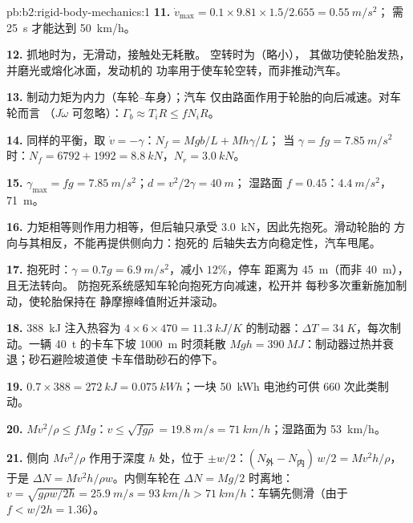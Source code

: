 \begin{solution}{pb:b2:rigid-body-mechanics:1}
\textbf{11.} $\dot v_{\max} = 0.1 \times 9.81 \times 1.5/2.655 = \qty{0.55}{m/s^2}$；
需 \qty{25}{s} 才能达到 \qty{50}{km/h}。

\textbf{12.} 抓地时为，无滑动，接触处无耗散。
空转时为（略小），
其做功使轮胎发热，并磨光或熔化冰面，发动机的
功率用于使车轮空转，而非推动汽车。

\textbf{13.} 制动力矩为内力（车轮–车身）；汽车
仅由路面作用于轮胎的向后减速。对车轮而言
（$J\dot\omega$ 可忽略）：$\Gamma_b \approx T_iR \le fN_iR$。

\textbf{14.} 同样的平衡，取 $\dot v = -\gamma$：$N_f = Mgb/L + Mh\gamma/L$；
当 $\gamma = fg = \qty{7.85}{m/s^2}$ 时：$N_f = 6792 + 1992 = \qty{8.8}{kN}$，$N_r =
\qty{3.0}{kN}$。

\textbf{15.} $\gamma_{\max} = fg = \qty{7.85}{m/s^2}$；$d = v^2/2\gamma = \qty{40}{m}$；
湿路面 $f = 0.45$：$\qty{4.4}{m/s^2}$，\qty{71}{m}。

\textbf{16.} 力矩相等则作用力相等，但后轴只承受
\qty{3.0}{kN}，因此先抱死。滑动轮胎的
方向与其相反，不能再提供侧向力：抱死的
后轴失去方向稳定性，汽车甩尾。

\textbf{17.} 抱死时：$\gamma = 0.7g = \qty{6.9}{m/s^2}$，减小 $12\%$，停车
距离为 \qty{45}{m}（而非 \qty{40}{m}），且无法转向。
防抱死系统感知车轮向抱死方向减速，松开并
每秒多次重新施加制动，使轮胎保持在
静摩擦峰值附近并滚动。

\textbf{18.} \qty{388}{kJ} 注入热容为 $4 \times 6 \times 470 = \qty{11.3}{kJ/K}$ 的制动器：$\Delta T =
\qty{34}{K}$，每次制动。一辆 \qty{40}{t} 的卡车下坡 \qty{1000}{m} 时须耗散
$Mgh = \qty{390}{MJ}$：制动器过热并衰退；砂石避险坡道使
卡车借助砂石的停下。

\textbf{19.} $0.7 \times 388 = \qty{272}{kJ} = \qty{0.075}{kWh}$；一块 \qty{50}{kWh}
电池约可供 $660$ 次此类制动。

\textbf{20.} $Mv^2/\rho \le fMg$：$v \le \sqrt{fg\rho} = \qty{19.8}{m/s} =
\qty{71}{km/h}$；湿路面为 \qty{53}{km/h}。

\textbf{21.} 侧向 $Mv^2/\rho$ 作用于深度 $h$ 处，位于
$\pm w/2$：$(N_{\text{外}} - N_{\text{内}})\,w/2 = Mv^2h/\rho$，于是 $\Delta N =
Mv^2h/\rho w$。内侧车轮在 $\Delta N = Mg/2$ 时离地：$v = \sqrt{g\rho w/2h} =
\qty{25.9}{m/s} = \qty{93}{km/h} > \qty{71}{km/h}$：车辆先侧滑（由于 $f <
w/2h = 1.36$）。


\end{solution}
